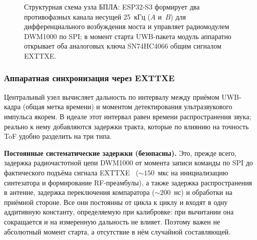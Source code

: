 \begin{figure}[h!]
\centering
{}
\caption{Структурная схема узла БПЛА: ESP32-S3 формирует два противофазных канала
несущей 25~кГц ($A$ и~$B$) для дифференциального возбуждения моста и управляет
радиомодулем DWM1000 по SPI; в момент старта UWB-пакета модуль аппаратно открывает
оба аналоговых ключа SN74HC4066 общим сигналом EXTTXE.}
\label{fig:uav-block}
\end{figure}

\subsubsection{Аппаратная синхронизация через EXTTXE}

Центральный узел вычисляет дальность по интервалу между приёмом UWB-кадра (общая метка
времени) и моментом детектирования ультразвукового импульса якорем. В идеале этот интервал
равен времени распространения звука; реально к нему добавляются задержки тракта, которые
по влиянию на точность ToF удобно разделить на три типа.

\textbf{Постоянные систематические задержки (безопасны).}
Это, прежде всего, задержка радиочастотной цепи DWM1000 от момента записи команды по SPI
до фактического подъёма сигнала EXTTXE~\cite{dw1000} (${\sim}150$~мкс на инициализацию синтезатора и
формирование RF-преамбулы), а также задержка распространения в антенне, задержка
переключения компаратора (${\sim}200$~нс) и обработки на приёмной стороне. Все они постоянны
от цикла к циклу и входят в одну аддитивную константу, определяемую при калибровке: при
вычитании она сокращается и на измеренную дальность не влияет. Поэтому важен не абсолютный
момент старта, а отсутствие в нём случайной составляющей.

